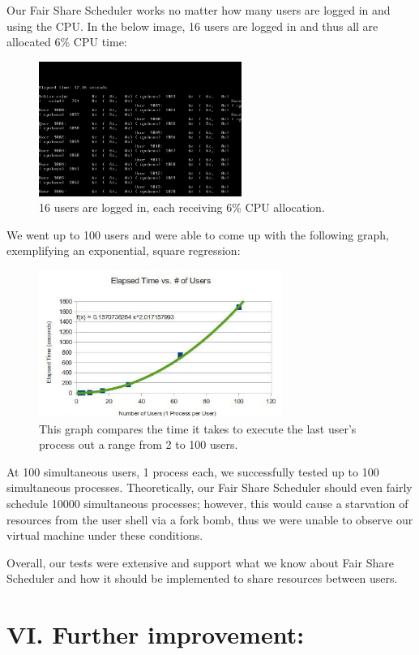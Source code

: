 \documentclass[10pt]{article}
\begin{document}
Our Fair Share Scheduler works no matter how many users are logged in and using the CPU. In the below image, 16 users are logged in and thus all are allocated 6\% CPU time:

\begin{figure}[H]
 \caption{16 users are logged in, each receiving 6\% CPU allocation.}
 \centering
 \includegraphics[width=250px]{fssch.jpg}
\end{figure}

We went up to 100 users and were able to come up with the following graph,
exemplifying an exponential, square regression:

\begin{figure}[H]
 \caption{This graph compares the time it takes to execute the last user's process out a range from 2 to 100 users.}
 \centering
 \includegraphics[width=300px]{graph.jpg}
\end{figure}

At 100 simultaneous users, 1 process each, we successfully tested up to 100 simultaneous processes. Theoretically, our Fair Share Scheduler should even fairly schedule 10000 simultaneous processes; however, this would cause a
starvation of resources from the user shell via a fork bomb, thus we were
unable to observe our virtual machine under these conditions. 

Overall, our tests were extensive and support what we know about Fair Share
Scheduler and how it should be implemented to share resources between users.  


\section{VI. Further improvement:}
\end{document}
